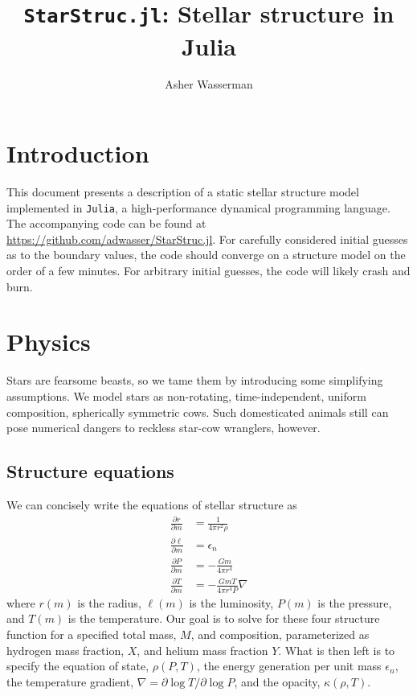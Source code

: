 \documentclass[onecolumn]{article}
\title{\texttt{StarStruc.jl}: Stellar structure in Julia}
\author{Asher Wasserman}
\date{}
\newcommand{\D}[2]{\ensuremath{\frac{\partial #1}{\partial #2}}}
\begin{document}
\maketitle

\section{Introduction}

This document presents a description of a static stellar structure model implemented in \texttt{Julia}, a high-performance dynamical programming language.  The accompanying code can be found at \url{https://github.com/adwasser/StarStruc.jl}.  For carefully considered initial guesses as to the boundary values, the code should converge on a structure model on the order of a few minutes.  For arbitrary initial guesses, the code will likely crash and burn.

\section{Physics}

Stars are fearsome beasts, so we tame them by introducing some simplifying assumptions.  We model stars as non-rotating, time-independent, uniform composition, spherically symmetric cows.  Such domesticated animals still can pose numerical dangers to reckless star-cow wranglers, however.


\subsection{Structure equations}

We can concisely write the equations of stellar structure as
\begin{align}
  \D{r}{m} &= \frac{1}{4\pi r^2 \rho} \label{eq:drdm} \\
  \D{\ell}{m} &= \epsilon_n  \label{eq:dldm} \\
  \D{P}{m} &= -\frac{Gm}{4\pi r^4} \label{eq:dPdm} \\
  \D{T}{m} &= -\frac{GmT}{4\pi r^4P} \nabla \label{eq:dTdm}
\end{align}
where $r(m)$ is the radius, $\ell(m)$ is the luminosity, $P(m)$ is the pressure, and $T(m)$ is the temperature.  Our goal is to solve for these four structure function for a specified total mass, $M$, and composition, parameterized as hydrogen mass fraction, $X$, and helium mass fraction $Y$.  What is then left is to specify the equation of state, $\rho(P, T)$, the energy generation per unit mass $\epsilon_n$, the temperature gradient, $\nabla = \partial\log T / \partial\log P$, and the opacity, $\kappa(\rho, T)$.
\end{document}
